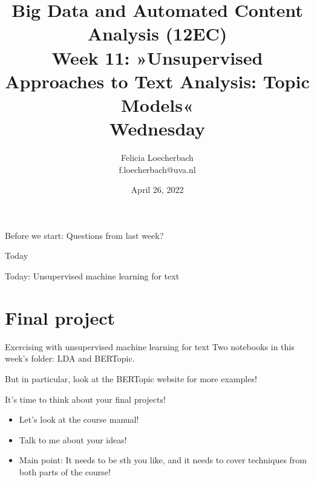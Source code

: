 \documentclass[compress]{beamer}
\begin{document}
\title[Big Data and Automated Content Analysis]{\textbf{Big Data and Automated Content Analysis (12EC)} 
\\Week 11: »Unsupervised Approaches to Text Analysis: Topic Models«
\\Wednesday}
\author[Felicia Loecherbach]{Felicia Loecherbach\\ \footnotesize{f.loecherbach@uva.nl \\}}
\date{April 26, 2022}


\begin{frame}{}
	\titlepage
\end{frame}

\begin{frame}[standout]
Before we start: Questions from last week?
\end{frame}



\begin{frame}{Today}
	\tableofcontents
\end{frame}

\begin{frame}[standout]
Today: Unsupervised machine learning for text
\end{frame}









\section{Final project}
\begin{frame}{Exercising with unsupervised machine learning for text}
Two notebooks in this week's folder: LDA and BERTopic.

But in particular, look at the BERTopic website for more examples!
\end{frame}


\begin{frame}{It's time to think about your final projects!}
\begin{itemize}
\item Let's look at the course manual!
\item Talk to me about your ideas!
\item Main point: It needs to be sth you like, and it needs to cover techniques from both parts of the course!
\end{itemize}
\end{frame}




\begin{frame}
	\printbibliography
\end{frame}
\end{document}
